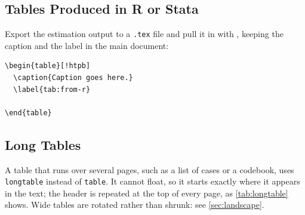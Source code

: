 \subsection{Tables Produced in R or Stata}

Export the estimation output to a \texttt{.tex} file and pull it in with
\verb||, keeping the caption and the label in the main document:

\begin{verbatim}
\begin{table}[!htpb]
  \caption{Caption goes here.}
  \label{tab:from-r}
  
\end{table}
\end{verbatim}



\subsection{Long Tables}

A table that runs over several pages, such as a list of cases or a
codebook, uses \verb|longtable| instead of \verb|table|. It cannot float,
so it starts exactly where it appears in the text; the header is repeated
at the top of every page, as \cref{tab:longtable} shows. Wide tables are
rotated rather than shrunk: see \cref{sec:landscape}.

